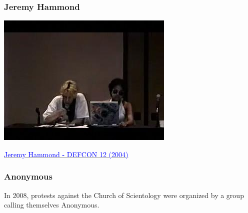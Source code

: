 \documentclass[aspectratio=169,usenames,dvipsnames]{beamer}
\begin{document}
\begin{frame}[c]
  \frametitle{Jeremy Hammond}

  \centering

  \includegraphics[width=\textwidth,height=0.75\textheight,keepaspectratio]{img/jeremy_hammond_defcon.jpg}

  \footnotesize
  \href{https://www.youtube.com/watch?v=UeZjWdg_Qn8}{\textcolor{blue}{Jeremy Hammond - DEFCON 12 (2004)}}
\end{frame}

\begin{frame}[c]
  \frametitle{Anonymous}

  In 2008, protests against the Church of Scientology were organized by a
  group calling themselves Anonymous.

\end{frame}
\end{document}

